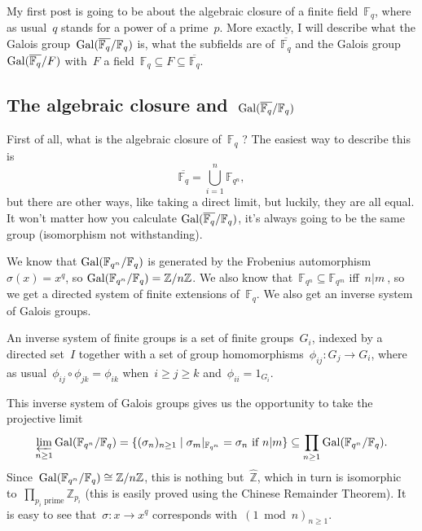 \label{section:algebraic-closures-finite-fields}
My first post is going to be about the algebraic closure of a finite field~$\mathbb{F}_q$, where as usual~$q$ stands for a power of a prime~$p$. More exactly, I will describe what the Galois group~$\operatorname{Gal}(\overline{\mathbb{F}_q}/\mathbb{F}_q)$ is, what the subfields are of~$\overline{\mathbb{F}_q}$ and the Galois group~$\operatorname{Gal}(\overline{\mathbb{F}_q}/F)$ with~$F$ a field~$\mathbb{F}_q \subseteq F \subseteq \overline{\mathbb{F}_q}$.

\subsection{The algebraic closure and~$\operatorname{Gal}(\overline{\mathbb{F}_q}/\mathbb{F}_q)$}
First of all, what is the algebraic closure of~$\mathbb{F}_q$ ? The easiest way to describe this is
\begin{equation}
  \overline{\mathbb{F}_q} = \bigcup_{i=1}^n \mathbb{F}_{q^n}, 
\end{equation}
but there are other ways, like taking a direct limit, but luckily, they are all equal. It won't matter how you calculate $\operatorname{Gal}(\overline{\mathbb{F}_q}/\mathbb{F}_q)$, it's always going to be the same group (isomorphism not withstanding).

We know that $\operatorname{Gal}(\mathbb{F}_{q^n}/\mathbb{F}_q)$ is generated by the Frobenius automorphism~$\sigma(x) = x^q$, so $\operatorname{Gal}(\mathbb{F}_{q^n}/\mathbb{F}_q) = \mathbb{Z}/n\mathbb{Z}$. We also know that~$\mathbb{F}_{q^n} \subseteq \mathbb{F}_{q^m}$ iff~$n |m~$, so we get a directed system of finite extensions of~$\mathbb{F}_q$. We also get an inverse system of Galois groups.

\begin{definition}
  An inverse system of finite groups is a set of finite groups~$G_i$, indexed by a directed set~$I$ together with a set of group homomorphisms~$\phi_{ij}:G_j \rightarrow G_i$, where as usual~$\phi_{ij} \circ \phi_{jk} = \phi_{ik}$ when~$i \geq j \geq k$ and~$\phi_{ii} = 1_{G_i}$.
\end{definition}

This inverse system of Galois groups gives us the opportunity to take the projective limit
\begin{equation}
  \varprojlim_{n \geq 1} \operatorname{Gal}(\mathbb{F}_{q^n}/\mathbb{F}_q) = \{ (\sigma_{n})_{n \geq 1} \mid \sigma_m|_{\mathbb{F}_{q^n}} = \sigma_{n} \text{ if } n|m \} \subseteq \prod_{n \geq 1} \operatorname{Gal}(\mathbb{F}_{q^n}/\mathbb{F}_q). 
\end{equation}
Since~$\operatorname{Gal}(\mathbb{F}_{q^n}/\mathbb{F}_q) \cong\mathbb{Z}/n\mathbb{Z}$, this is nothing but~$\widehat{\mathbb{Z}}$, which in turn is isomorphic to~$\prod_{p_{i} \text{ prime}} \mathbb{Z}_{p_{i}}$ (this is easily proved using the Chinese Remainder Theorem). It is easy to see that~$\sigma:x \rightarrow x^q$ corresponds with~$(1 \bmod n)_{n \geq 1}$.

